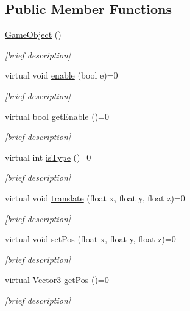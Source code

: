 \subsection*{Public Member Functions}
\begin{DoxyCompactItemize}
\item 
\hyperlink{class_game_object_a0348e3ee2e83d56eafca7a3547f432c4}{Game\-Object} ()
\begin{DoxyCompactList}\small\item\em \mbox{[}brief description\mbox{]} \end{DoxyCompactList}\item 
virtual void \hyperlink{class_game_object_a5e7b5056ab92f998cda8fa3779bf44d1}{enable} (bool e)=0
\begin{DoxyCompactList}\small\item\em \mbox{[}brief description\mbox{]} \end{DoxyCompactList}\item 
virtual bool \hyperlink{class_game_object_a0fa51b1d4bcf6756e4a5e1637fa01d78}{get\-Enable} ()=0
\begin{DoxyCompactList}\small\item\em \mbox{[}brief description\mbox{]} \end{DoxyCompactList}\item 
virtual int \hyperlink{class_game_object_a1d4237f8e511d5c6f0b1ad92480199b3}{is\-Type} ()=0
\begin{DoxyCompactList}\small\item\em \mbox{[}brief description\mbox{]} \end{DoxyCompactList}\item 
virtual void \hyperlink{class_game_object_a00ebf6691d90a55af08dd1b1afd7abaf}{translate} (float x, float y, float z)=0
\begin{DoxyCompactList}\small\item\em \mbox{[}brief description\mbox{]} \end{DoxyCompactList}\item 
virtual void \hyperlink{class_game_object_a6f33cf0e915855f22c7e115625138567}{set\-Pos} (float x, float y, float z)=0
\begin{DoxyCompactList}\small\item\em \mbox{[}brief description\mbox{]} \end{DoxyCompactList}\item 
virtual \hyperlink{struct_vector3}{Vector3} \hyperlink{class_game_object_a01903e73800537f21d25040de96b1e0a}{get\-Pos} ()=0
\begin{DoxyCompactList}\small\item\em \mbox{[}brief description\mbox{]} \end{DoxyCompactList}\item 

\end{DoxyCompactItemize}
